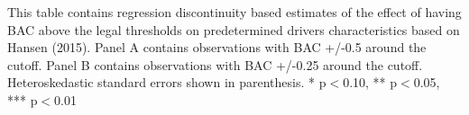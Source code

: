 \begin{table}[htbp]
\begin{center}
\begin{threeparttable}
\begin{tabular}{l*{6}{c}}
\bottomrule
\end{tabular}
\begin{tablenotes}
\tiny
\item This table contains regression discontinuity based estimates of the effect of having BAC above the legal thresholds on predetermined  drivers characteristics based on Hansen (2015). Panel A contains observations with BAC +/-0.5 around the cutoff. Panel B contains observations with BAC +/-0.25 around the cutoff.   Heteroskedastic standard errors shown in parenthesis.  * p$<$0.10, ** p$<$0.05, *** p$<$0.01
\end{tablenotes}
\end{threeparttable}
\end{center}
\end{table}
